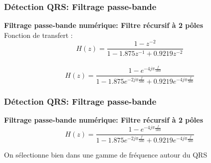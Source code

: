 \documentclass{beamer}
\begin{document}
\begin{frame}
\frametitle{Détection QRS: Filtrage passe-bande}
 \textbf{Filtrage passe-bande numérique: Filtre récursif à  2 pôles}\\

  \vspace{0.3 cm}
  Fonction de transfert :
   \[H(z) = \frac{1 - z^{-2}}{1 - 1.875 z^{-1} + 0.9219 z^{-2}} \]  \\
  \vspace{0.3cm}
   \[H(z) = \frac{1 - e^{-4 j \pi \frac{f}{500}}}{1 - 1.875 e^{-2 j \pi \frac{f}{500}} + 0.9219  e^{-4 j \pi \frac{f}{500}}} \] 

\end{frame}

\begin{frame}
\frametitle{Détection QRS: Filtrage passe-bande}
 \textbf{Filtrage passe-bande numérique: Filtre récursif à  2 pôles}\\
\[H(z) = \frac{1 - e^{-4 j \pi \frac{f}{500}}}{1 - 1.875 e^{-2 j \pi \frac{f}{500}} + 0.9219  e^{-4 j \pi \frac{f}{500}}} \] 
\begin{center}
\end{center}
\vspace{0.3cm}
On sélectionne bien dans une gamme de fréquence autour du QRS
\end{frame}
\end{document}
